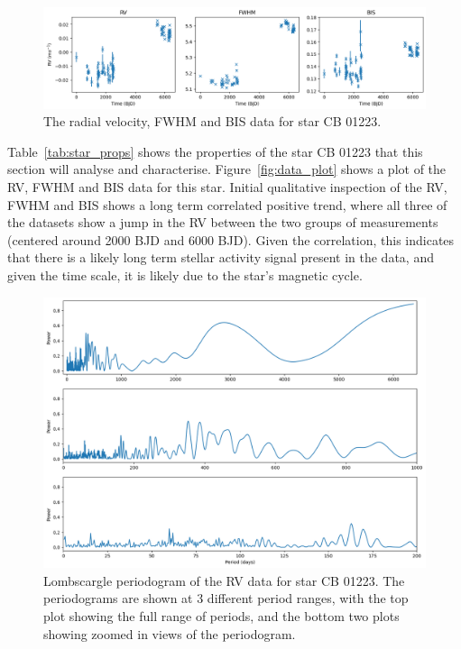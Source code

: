 \begin{figure}[htb]
    \centering
    \includegraphics[width=1\textwidth]{figures/data_plot}
    \caption{The radial velocity, FWHM and BIS data for star CB 01223.}
    \label{fig:data_plot}
\end{figure}

Table~\eqref{tab:star_props} shows the properties of the star CB 01223 that this section will analyse and characterise.
Figure~\eqref{fig:data_plot} shows a plot of the RV, FWHM and BIS data for this star.
Initial qualitative inspection of the RV, FWHM and BIS shows a long term correlated positive trend, where all three of the
datasets show a jump in the RV between the two groups of measurements (centered around 2000 BJD and 6000 BJD).
Given the correlation, this indicates that there is a likely long term stellar activity signal present in the data, and given
the time scale, it is likely due to the star's magnetic cycle.

\begin{figure}[htb]
    \centering
    \includegraphics[width=1\textwidth]{figures/lombscargle_periodogram_q2}
    \caption{Lombscargle periodogram of the RV data for star CB 01223. The periodograms are shown at 3 different period
    ranges, with the top plot showing the full range of periods, and the bottom two plots showing zoomed in views of the
    periodogram.}
    \label{fig:lombscargle_periodogram_q2}
\end{figure}

